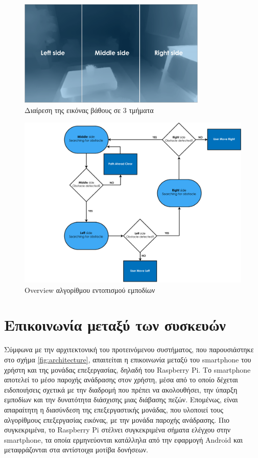 \begin{figure}[H]
    \centering
    \includegraphics[width=0.8\textwidth]{images/image_division.png}
    \caption{Διαίρεση της εικόνας βάθους σε 3 τμήματα}
    \label{fig:image-division}
\end{figure}
\newpage
\begin{figure}[H]
    \centering
    \includegraphics[width=\textwidth]{images/flow_obstacle_detector.png}
    \caption{Overview αλγορίθμου εντοπισμού εμποδίων}
    \label{fig:obstacle-flow}
\end{figure}

\section{Επικοινωνία μεταξύ των συσκευών}
Σύμφωνα με την αρχιτεκτονική του προτεινόμενου συστήματος, που παρουσιάστηκε στο σχήμα \ref{fig:architecture}, απαιτείται η επικοινωνία μεταξύ του smartphone του χρήστη και της μονάδας επεξεργασίας, δηλαδή του Raspberry Pi. Το smartphone αποτελεί το μέσο παροχής ανάδρασης στον χρήστη, μέσα από το οποίο δέχεται ειδοποιήσεις σχετικά με την διαδρομή που πρέπει να ακολουθήσει, την ύπαρξη εμποδίων και την δυνατότητα διάσχισης μιας διάβασης πεζών. Επομένως, είναι απαραίτητη η διασύνδεση της επεξεργαστικής μονάδας, που υλοποιεί τους αλγορίθμους επεξεργασίας εικόνας, με την μονάδα παροχής ανάδρασης. Πιο συγκεκριμένα, το Raspberry Pi στέλνει συγκεκριμένα σήματα ελέγχου στην smartphone, τα οποία ερμηνεύονται κατάλληλα από την εφαρμογή Android και μεταφράζονται στα αντίστοιχα μοτίβα δονήσεων.

